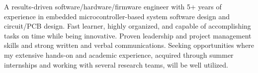\cvsummary
{
  A results-driven software/hardware/firmware engineer with 5+ years of experience in embedded microcontroller-based system software design and circuit/PCB design. Fast learner, highly organized, and capable of accomplishing tasks on time while being innovative. Proven leadership and project management skills and strong written and verbal communications. Seeking opportunities where my extensive hands-on and academic experience, acquired through summer internships and working with several research teams, will be well utilized.
}